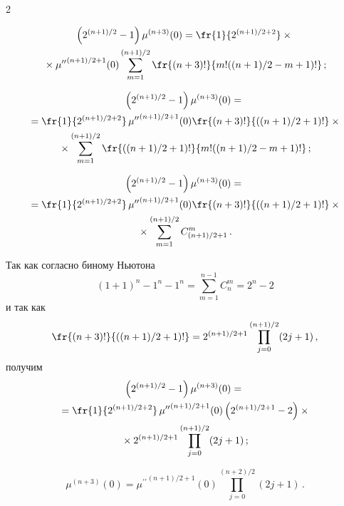 \begin{multicols}{2}
{\begin{enumerate}[1.]
  \pagebreak
  
  \noindent
  \begin{multline*}
  \left( 2^{(n+1)/2}-1\right) \mu^{(n+3)}(0)=
  \fr{1}{2^{(n+1)/2+2}}\times{}\\
  {}\times 
{\mu^{\prime\prime}}^{(n+1)/2+1}(0)\sum\limits_{m=1}^{(n+1)/2} \fr{(n+3)!}
  {m!((n+1)/2-m+1)!}\,;
  \end{multline*}

\vspace*{-12pt}

\noindent
  \begin{multline*}
  \left( 2^{(n+1)/2}-1\right) \mu^{(n+3)}(0)= {}\\
  {}=\fr{1}{2^{(n+1)/2+2}}\, 
{\mu^{\prime\prime}}^{(n+1)/2+1}(0) \fr{(n+3)!}{((n+1)/2+1)!} \times{}\\
{}\times
\sum\limits_{m=1}^{(n+1)/2} \fr{((n+1)/2+1)!}{m!((n+1)/2-m+1)!}\,;
  \end{multline*}
  
  \vspace*{-12pt}
  
  \noindent
  \begin{multline*}
  \left( 2^{(n+1)/2}-1\right) \mu^{(n+3)}(0)= {}\\
  {}=\fr{1}{2^{(n+1)/2+2}}\, 
{\mu^{\prime\prime}}^{(n+1)/2+1}(0) \fr{(n+3)!}{((n+1)/2+1)!} \times{}\\
{}\times
\sum\limits_{m=1}^{(n+1)/2} C^m_{(n+1)/2+1}\,.
  \end{multline*}
  
  Так как согласно биному Ньютона 
  $$
  (1+1)^n-1^n-1^n= \sum\limits_{m=1}^{n-1} C_n^m= 2^n-2
  $$ 
  и так как 
  $$
  \fr{(n+3)!}{((n+1)/2+1)!}=2^{(n+1)/2+1}\prod\limits_{j=0}^{(n+1)/2}(2j+1)\,,
  $$
  получим
  \begin{multline*}
  \left( 2^{(n+1)/2}-1\right) \mu^{(n+3)}(0)={}\\
  {}= \fr{1}{2^{(n+1)/2+2}}\, 
{\mu^{\prime\prime}}^{(n+1)/2+1}(0) \left( 2^{(n+1)/2+1}-2\right)\times{}\\
{}\times  2^{(n+1)/2+1} 
\prod\limits_{j=0}^{(n+1)/2}(2j+1)\,;
  \end{multline*}
  
  \vspace*{-12pt}
  
  \noindent
  \begin{equation*}
  \mu^{(n+3)}(0) ={\mu^{\prime\prime}}^{(n+1)/2+1}(0) 
\prod\limits_{j=0}^{(n+2)/2}(2j+1)\,.
  \end{equation*}
  

\end{enumerate}}
\end{multicols}
